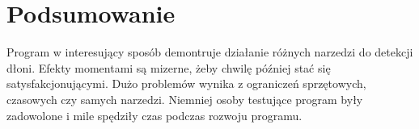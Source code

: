 \documentclass{article}
\begin{document}
\section{Podsumowanie}
Program w interesujący sposób demontruje działanie różnych narzedzi do detekcji dłoni. Efekty momentami są mizerne, żeby chwilę później stać się satysfakcjonującymi. Dużo problemów wynika z ograniczeń sprzętowych, czasowych czy samych narzedzi. Niemniej osoby testujące program były zadowolone i mile spędziły czas podczas rozwoju programu.
\end{document}
